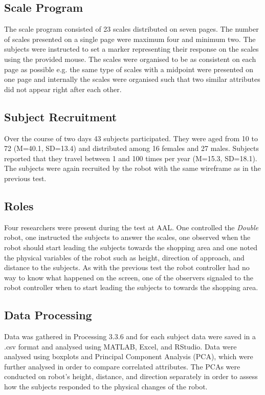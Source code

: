 \subsection{Scale Program}
The scale program consisted of 23 scales distributed on seven pages. The number of scales presented on a single page were maximum four and minimum two. The subjects were instructed to set a marker representing their response on the scales using the provided mouse. The scales were organised to be as consistent on each page as possible e.g. the same type of scales with a midpoint were presented on one page and internally the scales were organised such that two similar attributes did not appear right after each other.

\subsection{Subject Recruitment}
Over the course of two days 43 subjects participated. They were aged from 10 to 72 (M=40.1, SD=13.4) and distributed among 16 females and 27 males. Subjects reported that they travel between 1 and 100 times per year (M=15.3, SD=18.1). The subjects were again recruited by the robot with the same wireframe as in the previous test.

\subsection{Roles}
Four researchers were present during the test at AAL. One controlled the \textit{Double} robot, one instructed the subjects to answer the scales, one observed when the robot should start leading the subjects towards the shopping area and one noted the physical variables of the robot such as height, direction of approach, and distance to the subjects. As with the previous test the robot controller had no way to know what happened on the screen, one of the observers signaled to the robot controller when to start leading the subjects to towards the shopping area. 

\subsection{Data Processing}
Data was gathered in Processing 3.3.6 and for each subject data were saved in a .csv format and analysed using MATLAB, Excel, and RStudio. Data were analysed using boxplots and Principal Component Analysis (PCA), which were further analysed in order to compare correlated attributes. The PCAs were conducted on robot's height, distance, and direction separately in order to assess how the subjects responded to the physical changes of the robot.
